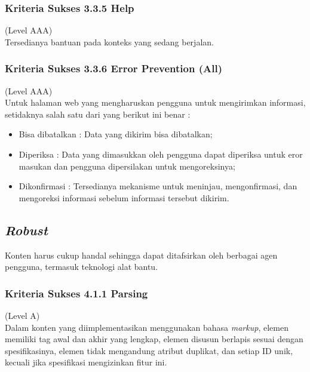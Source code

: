 \documentclass[a4paper,twoside]{article}
\begin{document}
\begin{enumerate}
		
		\subsubsection*{Kriteria Sukses 3.3.5 Help}
		\label{subsubsec:kriteria_3.3.5}
		(Level AAA) \\
		
		Tersedianya bantuan pada konteks yang sedang berjalan.
		
		
		\subsubsection*{Kriteria Sukses 3.3.6 Error Prevention (All)}
		\label{subsubsec:kriteria_3.3.6}
		(Level AAA) \\
		
		Untuk halaman web yang mengharuskan pengguna untuk mengirimkan informasi, setidaknya salah satu dari yang berikut ini benar :
		
		\begin{itemize}
			\item Bisa dibatalkan : Data yang dikirim bisa dibatalkan;
			\item Diperiksa : Data yang dimasukkan oleh pengguna dapat diperiksa untuk eror masukan dan pengguna dipersilakan untuk mengoreksinya;
			\item Dikonfirmasi : Tersedianya mekanisme untuk meninjau, mengonfirmasi, dan mengoreksi informasi sebelum informasi tersebut dikirim.
		\end{itemize}
		
		\subsection*{\textit{Robust}}
		\label{subsec:robust}
		Konten harus cukup handal sehingga dapat ditafsirkan oleh berbagai agen pengguna, termasuk teknologi alat bantu.
		
		\subsubsection*{Kriteria Sukses 4.1.1 Parsing}
		\label{subsubsec:kriteria_4.1.1}
		(Level A) \\
		
		Dalam konten yang diimplementasikan menggunakan bahasa \textit{markup}, elemen memiliki tag awal dan akhir yang lengkap, elemen disusun berlapis sesuai dengan spesifikasinya, elemen tidak mengandung atribut duplikat, dan setiap ID unik, kecuali jika spesifikasi mengizinkan fitur ini.
		

\end{enumerate}
\end{document}
